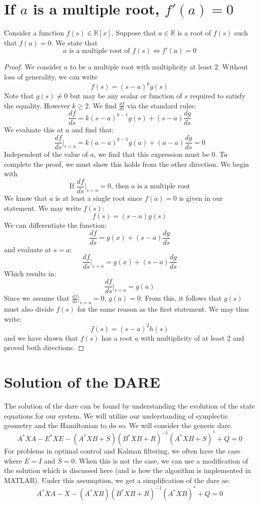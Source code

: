 \section{If $a$ is a multiple root, $f'(a)=0$}\label{multiple root}
Consider a function $f(s) \in \mathbb{R}[x]$. Suppose that $a\in\mathbb{R}$ is a root of $f(s)$ such that $f(a)=0$. We state that 
$$a \text{ is a multiple root of }f(s)\Leftrightarrow f'(a)=0$$
\begin{proof}
We consider $a$ to be a multiple root with multiplicity at least 2. Without loss of generality, we can write
$$f(s)=(s-a)^kg(s)$$
Note that $g(s)\neq0$ but may be any scalar or function of $s$ required to satisfy the equality. However $k\geq2$. We find $\frac{df}{ds}$ via the standard rules:
$$\frac{df}{ds}=k(s-a)^{k-1}g(s)+(s-a)\frac{dg}{ds}$$
We evaluate this at $a$ and find that:
$$\frac{df}{ds}\bigg\rvert_{s=a}=k(a-a)^{k-1}g(a)+(a-a)\frac{dg}{ds}=0$$
Independent of the value of $a$, we find that this expression must be $0$. To complete the proof, we must show this holds from the other direction. We begin with
$$\text{If }\frac{df}{ds}\bigg\rvert_{s=a}=0\text{, then } a \text{ is a multiple root} $$
We know that $a$ is at least a single root since $f(a)=0$ is given in our statement. We may write $f(s)$:
$$f(s)=(s-a)g(s)$$
We can differentiate the function:
$$\frac{df}{ds}=g(x)+(s-a)\frac{dg}{ds}$$
and evaluate at $s=a$:
$$\frac{df}{ds}\bigg\rvert_{s=a}=g(x)+(s-a)\frac{dg}{ds}$$
Which results in:
$$\frac{df}{ds}\bigg\rvert_{s=a}=g(a)$$
Since we assume that $\frac{df}{ds}\big\rvert_{s=a}=0$, $g(a)=0$. From this, it follows that $g(s)$ must also divide $f(s)$ for the same reason as the first statement. We may thus write:
$$f(s)=(s-a)^2h(s)$$
and we have shown that $f(s)$ has a root $a$ with multiplicity of at least 2 and proved both directions.

\end{proof}


\section{Solution of the DARE}\label{sec:derivation of dare}
The solution of the \gls{dare} can be found by understanding the evolution of the state equations for our system. We will utilize our understanding of symplectic geometry and the Hamiltonian to do so. We will consider the generic \gls{dare}.
$$A^*XA-E^*XE-(A^*XB+S)(B^*XB+R)^{-1}(A^*XB+S)^*+Q=0$$
For problems in optimal control and Kalman filtering, we often have the case where $E=I$ and $S=0$. When this is not the case, we can use a modification of the solution which is discussed here (and is how the algorithm is implemented in MATLAB). Under this assumption, we get a simplification of the \gls{dare} as:
$$A^*XA-X-(A^*XB)(B^*XB+R)^{-1}(A^*XB)^*+Q=0$$

